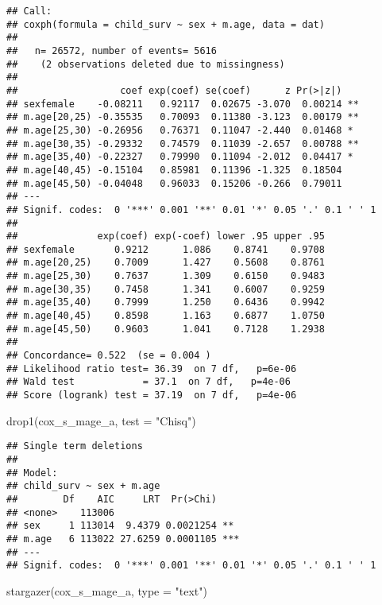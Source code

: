 \documentclass[
]{article}
\newenvironment{Shaded}{\begin{snugshade}}{\end{snugshade}}
\newcommand{\AttributeTok}[1]{\textcolor[rgb]{0.77,0.63,0.00}{#1}}
\newcommand{\FunctionTok}[1]{\textcolor[rgb]{0.00,0.00,0.00}{#1}}
\newcommand{\NormalTok}[1]{#1}
\newcommand{\StringTok}[1]{\textcolor[rgb]{0.31,0.60,0.02}{#1}}
\begin{document}
\begin{verbatim}
## Call:
## coxph(formula = child_surv ~ sex + m.age, data = dat)
## 
##   n= 26572, number of events= 5616 
##    (2 observations deleted due to missingness)
## 
##                  coef exp(coef) se(coef)      z Pr(>|z|)   
## sexfemale    -0.08211   0.92117  0.02675 -3.070  0.00214 **
## m.age[20,25) -0.35535   0.70093  0.11380 -3.123  0.00179 **
## m.age[25,30) -0.26956   0.76371  0.11047 -2.440  0.01468 * 
## m.age[30,35) -0.29332   0.74579  0.11039 -2.657  0.00788 **
## m.age[35,40) -0.22327   0.79990  0.11094 -2.012  0.04417 * 
## m.age[40,45) -0.15104   0.85981  0.11396 -1.325  0.18504   
## m.age[45,50) -0.04048   0.96033  0.15206 -0.266  0.79011   
## ---
## Signif. codes:  0 '***' 0.001 '**' 0.01 '*' 0.05 '.' 0.1 ' ' 1
## 
##              exp(coef) exp(-coef) lower .95 upper .95
## sexfemale       0.9212      1.086    0.8741    0.9708
## m.age[20,25)    0.7009      1.427    0.5608    0.8761
## m.age[25,30)    0.7637      1.309    0.6150    0.9483
## m.age[30,35)    0.7458      1.341    0.6007    0.9259
## m.age[35,40)    0.7999      1.250    0.6436    0.9942
## m.age[40,45)    0.8598      1.163    0.6877    1.0750
## m.age[45,50)    0.9603      1.041    0.7128    1.2938
## 
## Concordance= 0.522  (se = 0.004 )
## Likelihood ratio test= 36.39  on 7 df,   p=6e-06
## Wald test            = 37.1  on 7 df,   p=4e-06
## Score (logrank) test = 37.19  on 7 df,   p=4e-06
\end{verbatim}

\begin{Shaded}
\begin{Highlighting}[]
\FunctionTok{drop1}\NormalTok{(cox\_s\_mage\_a, }\AttributeTok{test =} \StringTok{"Chisq"}\NormalTok{)}
\end{Highlighting}
\end{Shaded}

\begin{verbatim}
## Single term deletions
## 
## Model:
## child_surv ~ sex + m.age
##        Df    AIC     LRT  Pr(>Chi)    
## <none>    113006                      
## sex     1 113014  9.4379 0.0021254 ** 
## m.age   6 113022 27.6259 0.0001105 ***
## ---
## Signif. codes:  0 '***' 0.001 '**' 0.01 '*' 0.05 '.' 0.1 ' ' 1
\end{verbatim}

\begin{Shaded}
\begin{Highlighting}[]
\FunctionTok{stargazer}\NormalTok{(cox\_s\_mage\_a, }\AttributeTok{type =} \StringTok{"text"}\NormalTok{)}
\end{Highlighting}
\end{Shaded}
\end{document}
